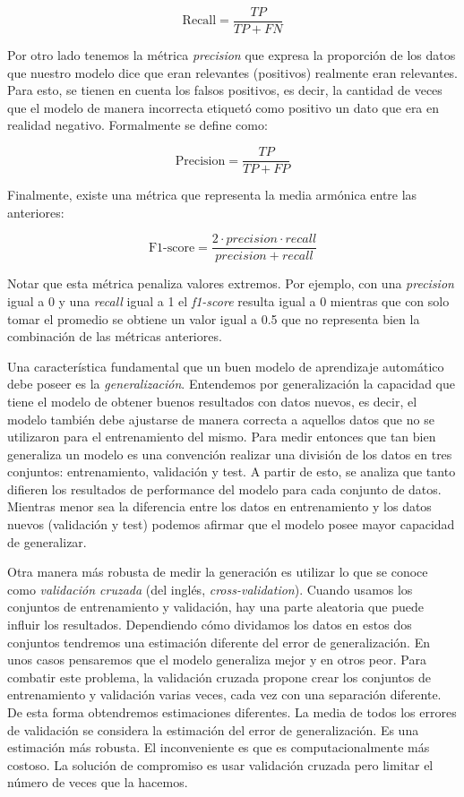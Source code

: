 \[
\text{Recall} = \frac{TP}{TP + FN}
\]

\vspace{5.0mm}

Por otro lado tenemos la métrica \textit{precision} que expresa la proporción de los datos que nuestro modelo dice que eran relevantes (positivos) realmente eran relevantes. Para esto, se tienen en cuenta los falsos positivos, es decir, la cantidad de veces que el modelo de manera incorrecta etiquetó como positivo un dato que era en realidad negativo. Formalmente se define como: 

\[
\text{Precision} = \frac{TP}{TP + FP}
\]

\vspace{5.0mm}

Finalmente, existe una métrica que representa la media armónica entre las anteriores:

\[
\text{F1-score} = \frac{2 \cdot precision\cdot recall}{precision + recall}
\]

\vspace{5.0mm}

Notar que esta métrica penaliza valores extremos. Por ejemplo, con una \textit{precision} igual a 0 y una \textit{recall} igual a 1 el \textit{f1-score} resulta igual a 0 mientras que con solo tomar el promedio se obtiene un valor igual a 0.5 que no representa bien la combinación de las métricas anteriores.

Una característica fundamental que un buen modelo de aprendizaje automático debe poseer es la \textit{generalización}. Entendemos por generalización la capacidad que tiene el modelo de obtener buenos resultados con datos nuevos, es decir, el modelo también debe ajustarse de manera correcta a aquellos datos que no se utilizaron para el entrenamiento del mismo. Para medir entonces que tan bien generaliza un modelo es una convención realizar una división de los datos en tres conjuntos: entrenamiento, validación y test. A partir de esto, se analiza que tanto difieren los resultados de performance del modelo para cada conjunto de datos. Mientras menor sea la diferencia entre los datos en entrenamiento y los datos nuevos (validación y test) podemos afirmar que el modelo posee mayor capacidad de generalizar.

Otra manera más robusta de medir la generación es utilizar lo que se conoce como \textit{validación cruzada} (del inglés, \textit{cross-validation}). Cuando usamos los conjuntos de entrenamiento y validación, hay una parte aleatoria que puede influir los resultados. Dependiendo cómo dividamos los datos en estos dos conjuntos tendremos una estimación diferente del error de generalización. En unos casos pensaremos que el modelo generaliza mejor y en otros peor. Para combatir este problema, la validación cruzada propone crear los conjuntos de entrenamiento y validación varias veces, cada vez con una separación diferente. De esta forma obtendremos estimaciones diferentes. La media de todos los errores de validación se considera la estimación del error de generalización. Es una estimación más robusta. El inconveniente es que es computacionalmente más costoso. La solución de compromiso es usar validación cruzada pero limitar el número de veces que la hacemos.


